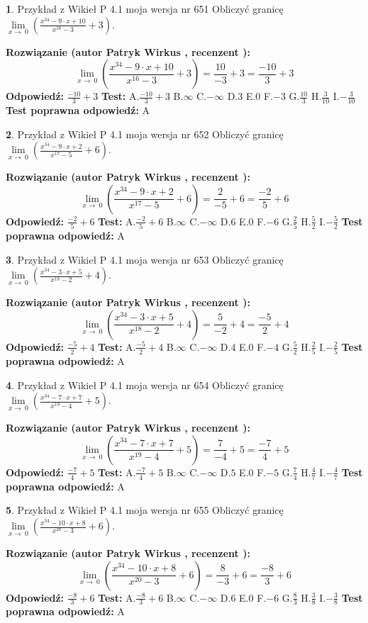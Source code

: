 \documentclass[12pt, a4paper]{article}
\theoremstyle{definition} %
\newtheorem{zad}{}
\newcommand{\zadStart}[1]{\begin{zad}#1\newline}
\newcommand{\zadStop}{\end{zad}}
\newcommand{\rozwStart}[2]{\noindent \textbf{Rozwiązanie (autor #1 , recenzent #2): }\newline}
\newcommand{\rozwStop}{\newline}
\newcommand{\odpStart}{\noindent \textbf{Odpowiedź:}\newline}
\newcommand{\odpStop}{\newline}
\newcommand{\testStart}{\noindent \textbf{Test:}\newline}
\newcommand{\testStop}{\newline}
\newcommand{\kluczStart}{\noindent \textbf{Test poprawna odpowiedź:}\newline}
\newcommand{\kluczStop}{\newline}
\begin{document}
\zadStart{Przykład z Wikieł P 4.1 moja wersja nr 651}
Obliczyć granicę $\lim\limits_{x\to\ 0}(\frac{x^{34}-9 \cdot x +10}{x^{16}-3}+3)$.
\zadStop
\rozwStart{Patryk Wirkus}{}
$$\lim\limits_{x\to\ 0}(\frac{x^{34}-9 \cdot x +10}{x^{16}-3}+3)=\frac{10}{-3}+3=\frac{-10}{3}+3$$
\rozwStop
\odpStart
$\frac{-10}{3}+3$
\odpStop
\testStart
A.$\frac{-10}{3}+3$
B.$\infty$
C.$-\infty$
D.$3$
E.$0$
F.$-3$
G.$\frac{10}{3}$
H.$\frac{3}{10}$
I.$-\frac{3}{10}$
\testStop
\kluczStart
A
\kluczStop



\zadStart{Przykład z Wikieł P 4.1 moja wersja nr 652}
Obliczyć granicę $\lim\limits_{x\to\ 0}(\frac{x^{34}-9 \cdot x +2}{x^{17}-5}+6)$.
\zadStop
\rozwStart{Patryk Wirkus}{}
$$\lim\limits_{x\to\ 0}(\frac{x^{34}-9 \cdot x +2}{x^{17}-5}+6)=\frac{2}{-5}+6=\frac{-2}{5}+6$$
\rozwStop
\odpStart
$\frac{-2}{5}+6$
\odpStop
\testStart
A.$\frac{-2}{5}+6$
B.$\infty$
C.$-\infty$
D.$6$
E.$0$
F.$-6$
G.$\frac{2}{5}$
H.$\frac{5}{2}$
I.$-\frac{5}{2}$
\testStop
\kluczStart
A
\kluczStop



\zadStart{Przykład z Wikieł P 4.1 moja wersja nr 653}
Obliczyć granicę $\lim\limits_{x\to\ 0}(\frac{x^{34}-3 \cdot x +5}{x^{18}-2}+4)$.
\zadStop
\rozwStart{Patryk Wirkus}{}
$$\lim\limits_{x\to\ 0}(\frac{x^{34}-3 \cdot x +5}{x^{18}-2}+4)=\frac{5}{-2}+4=\frac{-5}{2}+4$$
\rozwStop
\odpStart
$\frac{-5}{2}+4$
\odpStop
\testStart
A.$\frac{-5}{2}+4$
B.$\infty$
C.$-\infty$
D.$4$
E.$0$
F.$-4$
G.$\frac{5}{2}$
H.$\frac{2}{5}$
I.$-\frac{2}{5}$
\testStop
\kluczStart
A
\kluczStop



\zadStart{Przykład z Wikieł P 4.1 moja wersja nr 654}
Obliczyć granicę $\lim\limits_{x\to\ 0}(\frac{x^{34}-7 \cdot x +7}{x^{19}-4}+5)$.
\zadStop
\rozwStart{Patryk Wirkus}{}
$$\lim\limits_{x\to\ 0}(\frac{x^{34}-7 \cdot x +7}{x^{19}-4}+5)=\frac{7}{-4}+5=\frac{-7}{4}+5$$
\rozwStop
\odpStart
$\frac{-7}{4}+5$
\odpStop
\testStart
A.$\frac{-7}{4}+5$
B.$\infty$
C.$-\infty$
D.$5$
E.$0$
F.$-5$
G.$\frac{7}{4}$
H.$\frac{4}{7}$
I.$-\frac{4}{7}$
\testStop
\kluczStart
A
\kluczStop



\zadStart{Przykład z Wikieł P 4.1 moja wersja nr 655}
Obliczyć granicę $\lim\limits_{x\to\ 0}(\frac{x^{34}-10 \cdot x +8}{x^{20}-3}+6)$.
\zadStop
\rozwStart{Patryk Wirkus}{}
$$\lim\limits_{x\to\ 0}(\frac{x^{34}-10 \cdot x +8}{x^{20}-3}+6)=\frac{8}{-3}+6=\frac{-8}{3}+6$$
\rozwStop
\odpStart
$\frac{-8}{3}+6$
\odpStop
\testStart
A.$\frac{-8}{3}+6$
B.$\infty$
C.$-\infty$
D.$6$
E.$0$
F.$-6$
G.$\frac{8}{3}$
H.$\frac{3}{8}$
I.$-\frac{3}{8}$
\testStop
\kluczStart
A
\kluczStop
\end{document}
